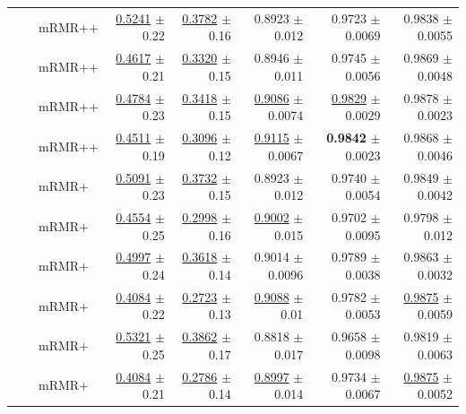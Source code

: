 \begin{longtable}{llp{}rrrrr}
 &  & mRMR++ & \underline{0.5241} {\scriptsize $\pm$ 0.22} & \underline{0.3782} {\scriptsize $\pm$ 0.16} & 0.8923 {\scriptsize $\pm$ 0.012} & 0.9723 {\scriptsize $\pm$ 0.0069} & 0.9838 {\scriptsize $\pm$ 0.0055} \\
 &  & mRMR++ & \underline{0.4617} {\scriptsize $\pm$ 0.21} & \underline{0.3320} {\scriptsize $\pm$ 0.15} & 0.8946 {\scriptsize $\pm$ 0.011} & 0.9745 {\scriptsize $\pm$ 0.0056} & 0.9869 {\scriptsize $\pm$ 0.0048} \\
 &  & mRMR++ & \underline{0.4784} {\scriptsize $\pm$ 0.23} & \underline{0.3418} {\scriptsize $\pm$ 0.15} & \underline{0.9086} {\scriptsize $\pm$ 0.0074} & \underline{0.9829} {\scriptsize $\pm$ 0.0029} & 0.9878 {\scriptsize $\pm$ 0.0023} \\
 &  & mRMR++ & \underline{0.4511} {\scriptsize $\pm$ 0.19} & \underline{0.3096} {\scriptsize $\pm$ 0.12} & \underline{0.9115} {\scriptsize $\pm$ 0.0067} & \textbf{0.9842} {\scriptsize $\pm$ 0.0023} & 0.9868 {\scriptsize $\pm$ 0.0046} \\
 &  & mRMR+ & \underline{0.5091} {\scriptsize $\pm$ 0.23} & \underline{0.3732} {\scriptsize $\pm$ 0.15} & 0.8923 {\scriptsize $\pm$ 0.012} & 0.9740 {\scriptsize $\pm$ 0.0054} & 0.9849 {\scriptsize $\pm$ 0.0042} \\
 &  & mRMR+ & \underline{0.4554} {\scriptsize $\pm$ 0.25} & \underline{0.2998} {\scriptsize $\pm$ 0.16} & \underline{0.9002} {\scriptsize $\pm$ 0.015} & 0.9702 {\scriptsize $\pm$ 0.0095} & 0.9798 {\scriptsize $\pm$ 0.012} \\
 &  & mRMR+ & \underline{0.4997} {\scriptsize $\pm$ 0.24} & \underline{0.3618} {\scriptsize $\pm$ 0.14} & 0.9014 {\scriptsize $\pm$ 0.0096} & 0.9789 {\scriptsize $\pm$ 0.0038} & 0.9863 {\scriptsize $\pm$ 0.0032} \\
 &  & mRMR+ & \underline{0.4084} {\scriptsize $\pm$ 0.22} & \underline{0.2723} {\scriptsize $\pm$ 0.13} & \underline{0.9088} {\scriptsize $\pm$ 0.01} & 0.9782 {\scriptsize $\pm$ 0.0053} & \underline{0.9875} {\scriptsize $\pm$ 0.0059} \\
 &  & mRMR+ & \underline{0.5321} {\scriptsize $\pm$ 0.25} & \underline{0.3862} {\scriptsize $\pm$ 0.17} & 0.8818 {\scriptsize $\pm$ 0.017} & 0.9658 {\scriptsize $\pm$ 0.0098} & 0.9819 {\scriptsize $\pm$ 0.0063} \\
 &  & mRMR+ & \underline{0.4084} {\scriptsize $\pm$ 0.21} & \underline{0.2786} {\scriptsize $\pm$ 0.14} & \underline{0.8997} {\scriptsize $\pm$ 0.014} & 0.9734 {\scriptsize $\pm$ 0.0067} & \underline{0.9875} {\scriptsize $\pm$ 0.0052} \\

\end{longtable}
